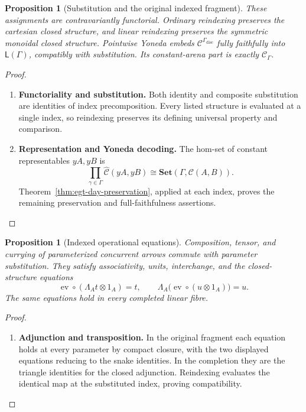 \documentclass[11pt,a4paper]{article}
\numberwithin{equation}{section}
\newtheorem{proposition}[theorem]{Proposition}
\theoremstyle{definition}
\theoremstyle{remark}
\theoremstyle{plain}
\begin{document}
\begin{proposition}[Substitution and the original indexed fragment]
\label{prop:egt-dependent-substitution}
These assignments are contravariantly functorial. Ordinary reindexing
preserves the cartesian closed structure, and linear reindexing preserves
the symmetric monoidal closed structure. Pointwise Yoneda embeds
$\mathcal C^{\Gamma_{\mathrm{disc}}}$ fully faithfully into
$\mathsf L(\Gamma)$, compatibly with substitution. Its constant-arena
part is exactly $\mathcal C_\Gamma$.
\end{proposition}
\begin{proof}
\leavevmode
\begin{enumerate}[label=\textup{(\arabic*)},leftmargin=*,itemsep=4pt,topsep=3pt]
  \item \textbf{Functoriality and substitution.} Both identity and composite substitution are identities of index
precomposition. Every listed structure is evaluated at a single index,
so reindexing preserves its defining universal property and comparison.
  \item \textbf{Representation and Yoneda decoding.} The hom-set of constant representables $yA,yB$ is
\[
 \prod_{\gamma\in\Gamma}\widehat{\mathcal C}(yA,yB)
 \cong\mathbf{Set}(\Gamma,\mathcal C(A,B)).
\]
Theorem~\ref{thm:egt-day-preservation}, applied at each index, proves
the remaining preservation and full-faithfulness assertions.
\end{enumerate}
\end{proof}

\begin{proposition}[Indexed operational equations]
\label{thm:egt-operational-soundness}
Composition, tensor, and currying of parameterized concurrent arrows
commute with parameter substitution. They satisfy associativity, units,
interchange, and the closed-structure equations
\[
 \operatorname{ev}\circ(\Lambda_A t\otimes1_A)=t,
 \qquad
 \Lambda_A\bigl(\operatorname{ev}\circ(u\otimes1_A)\bigr)=u.
\]
The same equations hold in every completed linear fibre.
\end{proposition}
\begin{proof}
\leavevmode
\begin{enumerate}[label=\textup{(\arabic*)},leftmargin=*,itemsep=4pt,topsep=3pt]
  \item \textbf{Adjunction and transposition.} In the original fragment each equation holds at every parameter by
compact closure, with the two displayed equations reducing to the snake
identities. In the completion they are the triangle identities for the
closed adjunction. Reindexing evaluates the identical map at the
substituted index, proving compatibility.
\end{enumerate}
\end{proof}
\end{document}
